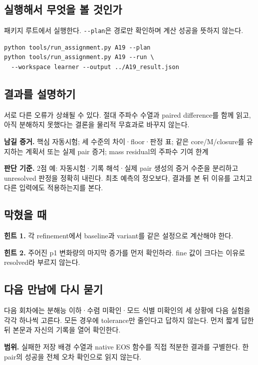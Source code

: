 \documentclass[
  10pt,
  a4paper,
]{article}
\begin{document}
\newpage

\subsection{실행해서 무엇을 볼
것인가}\label{uxc2e4uxd589uxd574uxc11c-uxbb34uxc5c7uxc744-uxbcfc-uxac83uxc778uxac00}

패키지 루트에서 실행한다. \texttt{-\/-plan}은 경로만 확인하며 계산
성공을 뜻하지 않는다.

\begin{verbatim}
python tools/run_assignment.py A19 --plan
python tools/run_assignment.py A19 --run \
  --workspace learner --output ../A19_result.json
\end{verbatim}

\subsection{결과를
설명하기}\label{uxacb0uxacfcuxb97c-uxc124uxba85uxd558uxae30}

서로 다른 오류가 상쇄될 수 있다. 절대 주파수 수열과 paired difference를
함께 읽고, 아직 분해하지 못했다는 결론을 물리적 무효과로 바꾸지 않는다.

\textbf{남길 증거.} 핵심 자동시험; 세 수준의 차이·floor·판정 표; 같은
core/M/closure를 유지하는 계획서 또는 실제 pair 증거; mass residual의
주파수 기여 한계

\textbf{판단 기준.} 2점 예: 자동시험·기록 해석·실제 pair 생성의 증거
수준을 분리하고 unresolved 판정을 정확히 내린다. 최초 예측의 정오보다,
결과를 본 뒤 이유를 고치고 다른 입력에도 적용하는지를 본다.

\subsection{막혔을 때}\label{uxb9c9uxd614uxc744-uxb54c}

\textbf{힌트 1.} 각 refinement에서 baseline과 variant를 같은 설정으로
계산해야 한다.

\textbf{힌트 2.} 주어진 p1 변화량의 마지막 증가를 먼저 확인하라. fine
값이 크다는 이유로 resolved라 부르지 않는다.

\subsection{다음 만남에 다시
묻기}\label{uxb2e4uxc74c-uxb9ccuxb0a8uxc5d0-uxb2e4uxc2dc-uxbb3buxae30}

다음 회차에는 분해능 이하·수렴 미확인·모드 식별 미확인의 세 상황에 다음
실험을 각각 하나씩 고른다. 모든 경우에 tolerance만 줄인다고 답하지
않는다. 먼저 짧게 답한 뒤 본문과 자신의 기록을 열어 확인한다.

\textbf{범위.} 실패한 저장 배경 수열과 native EOS 함수를 직접 적분한
결과를 구별한다. 한 pair의 성공을 전체 오차 확인으로 읽지 않는다.
\end{document}

